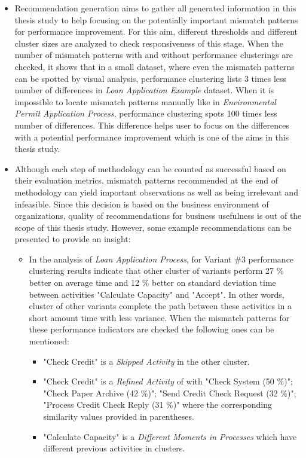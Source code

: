 \begin{itemize}
	\item Recommendation generation aims to gather all generated information in this thesis study to help focusing on the potentially important mismatch patterns for performance improvement. For this aim, different thresholds and different cluster sizes are analyzed to check responsiveness of this stage. When the number of mismatch patterns with and without performance clusterings are checked, it shows that in a small dataset, where even the mismatch patterns can be spotted by visual analysis, performance clustering lists 3 times less number of differences in \textit{Loan Application Example} dataset. When it is impossible to locate mismatch patterns manually like in \textit{Environmental Permit Application Process}, performance clustering spots 100 times less number of differences. This difference helps user to focus on the differences with a potential performance improvement which is one of the aims in this thesis study.
	\item Although each step of methodology can be counted as successful based on their evaluation metrics, mismatch patterns recommended at the end of methodology can yield important observations as well as being irrelevant and infeasible. Since this decision is based on the business environment of organizations, quality of recommendations for business usefulness is out of the scope of this thesis study. However, some example recommendations can be presented to provide an insight:
	\begin{itemize}
	\item In the analysis of \textit{Loan Application Process}, for Variant \#3 performance clustering results indicate that other cluster of variants perform 27 \% better on average time and 12 \% better on standard deviation time between activities "Calculate Capacity" and "Accept". In other words, cluster of other variants complete the path between these activities in a short amount time with less variance. When the mismatch patterns for these performance indicators are checked the following ones can be mentioned:
		\begin{itemize}
		\item "Check Credit" is a \textit{Skipped Activity} in the other cluster.
		\item "Check Credit" is a \textit{Refined Activity} of with "Check System (50 \%)"; "Check Paper Archive (42 \%)"; "Send Credit Check Request (32 \%)"; "Process Credit Check Reply (31 \%)" where the corresponding similarity values provided in parentheses.
		\item "Calculate Capacity" is a \textit{Different Moments in Processes} which have different previous activities in clusters. 

\end{itemize}
\end{itemize}
\end{itemize}
